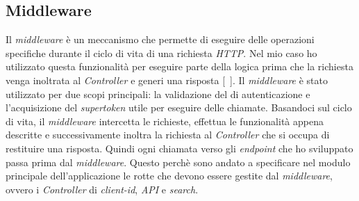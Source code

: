 \subsection{Middleware}\label{subsec:middleware}
Il \textit{middleware} è un meccanismo che permette di eseguire delle operazioni specifiche durante il ciclo di vita di una richiesta \textit{HTTP}. 
Nel mio caso ho utilizzato questa funzionalità per eseguire parte della logica prima che la richiesta venga inoltrata al \textit{Controller} e generi una risposta [~\cite{site:middleware}].
Il \textit{middleware} è stato utilizzato per due scopi principali: la validazione del  di autenticazione e l'acquisizione del \textit{supertoken} utile per eseguire delle chiamate.
Basandoci sul ciclo di vita, il \textit{middleware} intercetta le richieste, effettua le funzionalità appena descritte e successivamente inoltra la richiesta al \textit{Controller} che si occupa di restituire una risposta.
Quindi ogni chiamata verso gli \textit{endpoint} che ho sviluppato passa prima dal \textit{middleware}. Questo perchè sono andato a specificare
nel modulo principale dell'applicazione le rotte che devono essere gestite dal \textit{middleware}, ovvero i \textit{Controller} di \textit{client-id}, \textit{API} e \textit{search}.

